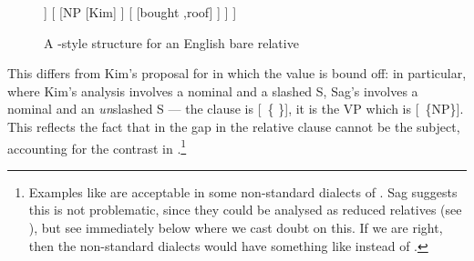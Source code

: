 \documentclass[output=paper
 	        ,biblatex
                ,babelshorthands
                ,newtxmath
                ,draftmode
                ,colorlinks, citecolor=brown
]{langscibook}
\begin{document}
\begin{figure}
\begin{forest}  %
	[\ibar{N}    , baseline
		[\ibox{2}
			[cakes]
		]
		[%
			[NP
				[Kim]
			]
			[
				[bought ,roof]
			]
		]
	]
\end{forest}
	\caption{A \cite{Sag:97}-style structure for an English bare relative}
	\label{fig:rc-8}
\end{figure}

 
This differs from Kim's proposal for  in which the  value is
bound off: in particular, where Kim's analysis involves a nominal and a slashed S, Sag's
involves a nominal and an \emph{un}slashed S --- the clause is [~\{ \}], it
is the VP which is [~\{NP\}]. This reflects the fact that in  the gap in the
relative clause cannot be the subject, accounting for the contrast
in .\footnote{Examples like  are acceptable in some non-standard dialects of
  . Sag suggests this is not problematic, since they could be analysed as
  reduced relatives
  (see \citealt[471]{Sag:97}), but see immediately below where we cast doubt on this. If we
  are right, then the non-standard dialects would have something like 
  instead of .}
\begin{exe}\ex\begin{xlist}\label{x:rc-94}
  \label{x:rc-95}
  \label{x:rc-96}
\end{xlist}\end{exe}
\end{document}
